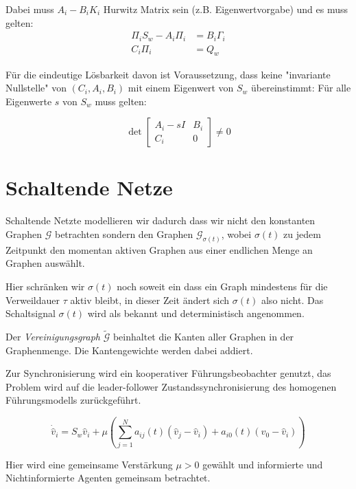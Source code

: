 Dabei muss $A_i - B_i K_i$ Hurwitz Matrix sein (z.B. Eigenwertvorgabe) und es muss
gelten:
\begin{align}
    \Pi_i S_w - A_i \Pi_i &= B_i \Gamma_i \\
    C_i \Pi_i &= Q_w
\end{align}

Für die eindeutige Lösbarkeit davon ist Voraussetzung, dass keine "invariante Nullstelle"
von $(C_i, A_i, B_i)$ mit einem Eigenwert von $S_w$ übereinstimmt:
Für alle Eigenwerte $s$ von $S_w$ muss gelten:

\begin{equation}
    \det \begin{bmatrix}
        A_i -sI & B_i \\
        C_i & 0
    \end{bmatrix}
    \neq 0
\end{equation}

\pagebreak
\section{Schaltende Netze}

Schaltende Netzte modellieren wir dadurch dass wir nicht den konstanten
Graphen $\mathcal{G}$ betrachten sondern den Graphen $\mathcal{G}_{\sigma(t)}$,
wobei $\sigma(t)$ zu jedem Zeitpunkt den momentan aktiven Graphen
aus einer endlichen Menge an Graphen auswählt.

Hier schränken wir $\sigma(t)$ noch soweit ein dass ein Graph mindestens
für die Verweildauer $\tau$ aktiv bleibt, in dieser Zeit ändert sich
$\sigma(t)$ also nicht.
Das Schaltsignal $\sigma(t)$ wird als bekannt und deterministisch 
angenommen.

Der \emph{Vereinigungsgraph} $\tilde{\mathcal{G}}$ beinhaltet die Kanten
aller Graphen in der Graphenmenge.
Die Kantengewichte werden dabei addiert.

Zur Synchronisierung wird ein kooperativer Führungsbeobachter genutzt,
das Problem wird auf die leader-follower Zustandssynchronisierung
des homogenen Führungsmodells zurückgeführt.

\begin{equation}
    \dot{\hat{v}}_i = S_w \hat{v}_i + \mu \left( \sum_{j=1}^N a_{ij}(t)
    (\hat{v}_j - \hat{v}_i) + a_{i0}(t)(v_0 - \hat{v}_i) \right)   
\end{equation}

Hier wird eine gemeinsame Verstärkung $\mu >0$ gewählt und informierte
und Nichtinformierte Agenten gemeinsam betrachtet.

